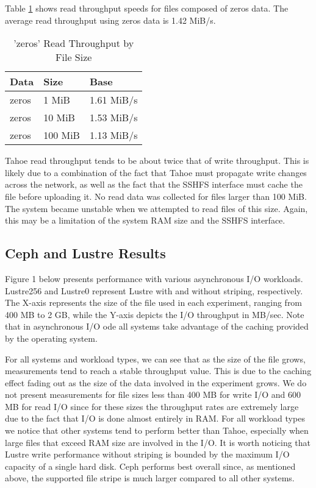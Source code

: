 \documentclass[11pt]{article}
\begin{document}
Table \ref{tbl:TahoeReadZeros} shows read throughput speeds for files
composed of zeros data. The average read throughput using
zeros data is 1.42 MiB/s.

\begin{table}
  \begin{center}
    \begin{tabularx}{\textwidth}{|X|X|X|}
      \hline
      {\bf Data} & {\bf Size} & {\bf Base} \\ \hline
      zeros & 1 MiB & 1.61 MiB/s \\ \hline
      zeros & 10 MiB & 1.53 MiB/s \\ \hline
      zeros & 100 MiB & 1.13 MiB/s \\ \hline
    \end{tabularx}
    \caption{'zeros' Read Throughput by File Size}
    \label{tbl:TahoeReadZeros}
  \end{center}
\end{table}

Tahoe read throughput tends to be about twice that of write
throughput. This is likely due to a combination of the fact that Tahoe
must propagate write changes across the network, as well as the fact
that the SSHFS interface must cache the file before uploading it. No
read data was collected for files larger than 100 MiB. The system
became unstable when we attempted to read files of this size. Again,
this may be a limitation of the system RAM size and the SSHFS interface.

\subsection{Ceph and Lustre Results}
Figure 1 below presents performance with various asynchronous I/O 
workloads. Lustre256 and Lustre0 represent Lustre with and without 
striping, respectively. The X-axis represents the size of the file 
used in each experiment, ranging from 400 MB to 2 GB, while the Y-axis 
depicts the I/O throughput in MB/sec. Note that in asynchronous I/O 
ode all systems take advantage of the caching provided by the operating 
system.


For all systems and workload types, we can see that as the size 
of the file grows, measurements tend to reach a stable throughput value. This 
is due to the caching effect fading out as the size of the data involved in 
the experiment grows. We do not present measurements for file sizes less than 
400 MB for write I/O and 600 MB for read I/O since for these sizes the 
throughput rates are extremely large due to the fact that I/O is done almost 
entirely in RAM. For all workload types we notice that other systems tend to 
perform better than Tahoe, especially when large files that exceed RAM size 
are involved in the I/O. It is worth noticing that Lustre write performance 
without striping is bounded by the maximum I/O capacity of a single hard disk. 
Ceph performs best overall since, as mentioned above, the supported file stripe 
is much larger compared to all other systems.
\end{document}
